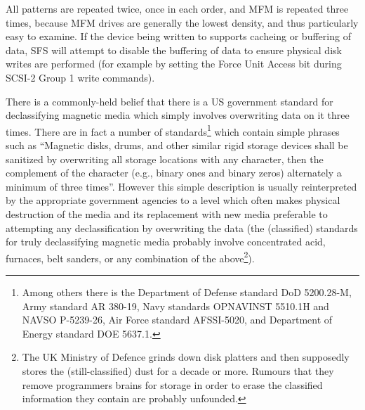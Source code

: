 All patterns are repeated twice, once in each order, and MFM is repeated three
times, because MFM drives are generally the lowest density, and thus
particularly easy to examine.  If the device being written to supports cacheing
or buffering of data, SFS will attempt to disable the buffering of data to
ensure physical disk writes are performed (for example by setting the Force
Unit Access bit during SCSI-2 Group 1 write commands).

There is a commonly-held belief that there is a US government standard for
declassifying magnetic media which simply involves overwriting data on it three 
times.  There are in fact a number of standards\footnote{
               Among others there is the Department of Defense standard DoD
               5200.28-M, Army standard AR 380-19, Navy standards OPNAVINST
               5510.1H and NAVSO P-5239-26, Air Force standard AFSSI-5020, and
               Department of Energy standard DOE 5637.1.
} which contain simple phrases
such as ``Magnetic disks, drums, and other similar rigid storage devices shall
be sanitized by overwriting all storage locations with any character, then the
complement of the character (e.g., binary ones and binary zeros) alternately a
minimum of three times''.  However this simple description is usually
reinterpreted by the appropriate government agencies to a level which often
makes physical destruction of the media and its replacement with new media
preferable to attempting any declassification by overwriting the data (the
(classified) standards for truly declassifying magnetic media probably involve
concentrated acid, furnaces, belt sanders, or any combination of the above\footnote{
		The UK Ministry of Defence grinds down disk platters and then
              	supposedly stores the (still-classified) dust for a decade or
                more.  Rumours that they remove programmers brains for storage in 
                order to erase the classified information they contain are
                probably unfounded.
}).

